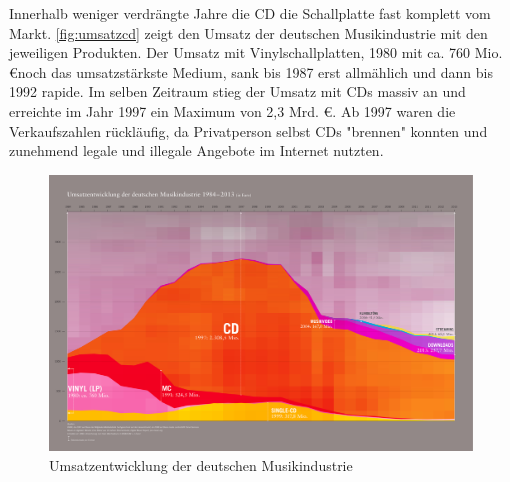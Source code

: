 Innerhalb weniger verdrängte Jahre die CD die Schallplatte fast komplett vom
Markt. \autoref{fig:umsatzcd} zeigt den Umsatz der deutschen Musikindustrie mit
den jeweiligen Produkten. Der Umsatz mit Vinylschallplatten, 1980 mit ca. 760
Mio. \euro noch das umsatzstärkste Medium, sank bis 1987 erst all­mäh­lich und
dann bis 1992 rapide. Im selben Zeitraum stieg der Umsatz mit CDs massiv an und
erreichte im Jahr 1997 ein Maximum von 2,3 Mrd. \euro. Ab 1997 waren die
Verkaufszahlen rückläufig, da Privatperson selbst CDs
"brennen" konnten und zunehmend legale und
illegale Angebote im Internet nutzten.

\begin{figure}[h]
    \begin{center}
        \begin{minipage}[t]{\textwidth}
            \begin{center}
                \includegraphics[width=\textwidth]{Bilder/Optische_Datentraeger_Die_Compact_Disc/Geschichte/cdumsatz.png}
                \caption[Umsatzentwicklung der deutschen Musikindustrie \newline \url{http://www.musikindustrie.de/uploads/media/140325\_BVMI\_2013\_Jahrbuch\_ePaper\_V02.pdf} S.7 (zuletzt aufgerufen am 03.08.2015)]{Umsatzentwicklung der deutschen Musikindustrie}
                \label{fig:umsatzcd}
            \end{center}
        \end{minipage}
    \end{center}
\end{figure}
